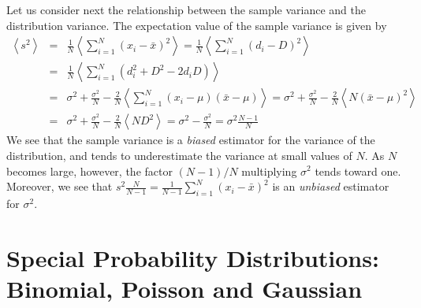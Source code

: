 \documentclass{revtex4}
\begin{document}
Let us consider next the relationship between the sample variance and
the distribution variance. The
expectation value of the sample variance is given by
\begin{eqnarray}
  \left<s^2 \right> &=& \frac{1}{N} \left<\sum_{i=1}^N (x_i -
    \bar{x})^2 \right> = \frac{1}{N} \left<\sum_{i=1}^N (d_i -D)^2
  \right> \nonumber \\
  &=& \frac{1}{N} \left<\sum_{i=1}^N \left( d_i^2 + D^2 - 2d_i D
    \right)\right> \nonumber \\
  &=& \sigma^2 + \frac{\sigma^2}{N} - \frac{2}{N} \left<\sum_{i=1}^N
    (x_i-\mu)(\bar{x}-\mu)\right> = \sigma^2 + \frac{\sigma^2}{N} -
  \frac{2}{N} \left<N (\bar{x}-\mu)^2 \right> \nonumber \\
  &=& \sigma^2 + \frac{\sigma^2}{N} - \frac{2}{N}\left<N D^2 \right> =
  \sigma^2 - \frac{\sigma^2}{N} = \sigma^2 \frac{N-1}{N} 
\end{eqnarray}
We see that the sample variance is a \emph{biased} estimator for the
variance of the distribution, and tends to underestimate the variance
at small values of $N$. As $N$ becomes large, however, the factor
$(N-1)/N$ multiplying $\sigma^2$ tends toward one. Moreover, we see
that $s^2 \frac{N}{N-1} = \frac{1}{N-1}\sum_{i=1}^N (x_i - \bar{x})^2$
is an \emph{unbiased} estimator for $\sigma^2$.
\section{Special Probability Distributions: Binomial, Poisson and
  Gaussian}
\end{document}
